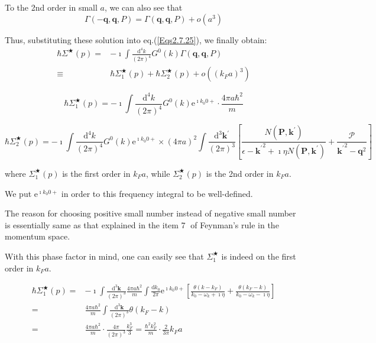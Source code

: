 To the 2nd order in small $a$, we can also see that
\begin{equation*} \label{Eqs2.7.26'} \tag{2.7.26'}
\Gamma(-\mathbf{q},\mathbf{q},P)=\Gamma(\mathbf{q},\mathbf{q},P) + o(a^3)
\end{equation*}

Thus, substituting these solution into eq.(\ref{Eqs2.7.25}), we finally obtain:
\begin{equation} \label{Eqs2.7.27} \begin{split}
\hbar \Sigma^{\bigstar}(p) =& -\imath \int \frac{\mathrm{d}^4 k}{(2\pi)^4} G^0(k) \Gamma(\mathbf{q},\mathbf{q},P)\\
\equiv& \hbar \Sigma_1^{\bigstar}(p) + \hbar \Sigma_2^{\bigstar}(p) + o((k_F a)^3)
\end{split} \end{equation}

\begin{equation*} \label{Eqs2.7.27'} \tag{2.7.27'}
\hbar \Sigma_1^{\bigstar}(p) = -\imath \int \frac{\mathrm{d}^4 k}{(2\pi)^4} G^0(k) \mathrm{e}^{\imath k_0 0 +} \cdot \frac{4\pi a \hbar^2}{m}
\end{equation*}

\begin{equation*} \label{Eqs2.7.27''} \tag{2.7.27''}
\hbar \Sigma_2^{\bigstar}(p) = -\imath \int \frac{\mathrm{d}^4 k}{(2\pi)^4} G^0(k) \mathrm{e}^{\imath k_0 0 +} \times (4\pi a)^2 \int \frac{\mathrm{d}^3 \mathbf{k}^{'}}{(2\pi)^3}\left[ \frac{N(\mathbf{P},\mathbf{k}^{'})}{\epsilon-{\mathbf{k}^{'}}^2 + \imath \eta N(\mathbf{P},\mathbf{k}^{'})} + \frac{\mathscr{P}}{{\mathbf{k}^{'}}^2-\mathbf{q}^2} \right]
\end{equation*}

where $\Sigma_1^{\bigstar}(p)$ is the first order in $k_F a$, while $\Sigma_2^{\bigstar}(p)$ is the 2nd order in $k_F a$.

We put $\mathrm{e}^{\imath k_0 0+}$ in order to this frequency integral to be well-defined.

The reason for choosing positive small number instead of negative small number is essentially same as that explained in the item \textcircled{7} of Feynman's rule in the momentum space.

With this phase factor in mind, one can easily see that $\Sigma_1^{\bigstar}$ is indeed on the first order in $k_F a$.

\begin{equation} \label{Eqs2.7.28} \begin{split}
\hbar \Sigma_1^{\bigstar}(p) =& -\imath \int \frac{\mathrm{d}^3 \mathbf{k}}{(2\pi)^3}\frac{4\pi a \hbar^2}{m} \int \frac{\mathrm{d}k_0}{2\pi} \mathrm{e}^{\imath k_0 0+} \left[ \frac{\theta(k-k_F)}{k_0-\omega_k + \imath \eta} + \frac{\theta(k_F-k)}{k_0-\omega_k-\imath \eta} \right]\\
=& \frac{4\pi a \hbar^2}{m} \int \frac{\mathrm{d}^3 \mathbf{k}}{(2\pi)^3} \theta(k_F-k)\\
=&\frac{4\pi a \hbar^2}{m} \cdot \frac{4\pi}{(2\pi)^3} \frac{k_F^3}{3} = \frac{\hbar^2 k_F^2}{m}\cdot\frac{2}{3\pi} k_F a
\end{split} \end{equation}

